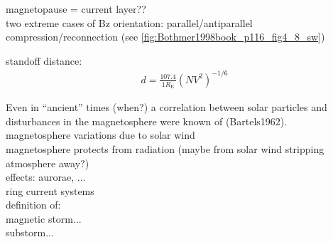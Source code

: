 magnetopause = current layer??\\

two extreme cases of Bz orientation: parallel/antiparallel\\
compression/reconnection (see \autoref{fig:Bothmer1998book_p116_fig4_8_sw})\\
\begin{figure}[htb]
\end{figure}

standoff distance:	\citep[p.~112]{Bothmer2007}
\begin{align}
	d = \frac{107.4}{1 R_\text{E}} (N V^2)^{-1/6}
\end{align}

Even in ``ancient'' times (when?) a correlation between solar particles and disturbances in the magnetosphere were known of (Bartels1962).\\

magnetosphere variations due to solar wind\\
magnetosphere protects from radiation (maybe from solar wind stripping atmosphere away?)\\

effects: aurorae, ...\\

ring current systems\\

definition of:\\
magnetic storm...\\
substorm...\\

